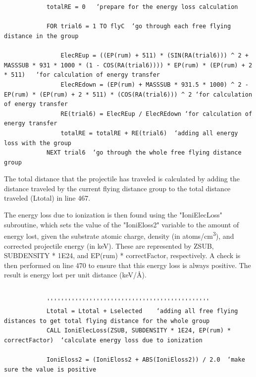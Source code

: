 \documentclass[10pt, reqno]{exam}
\begin{document}
\begin{verbatim}
    
    
            totalRE = 0   ‘prepare for the energy loss calculation 
    
            FOR trial6 = 1 TO flyC  ‘go through each free flying distance in the group
    
                ElecREup = ((EP(rum) + 511) * (SIN(RA(trial6))) ^ 2 + MASSSUB * 931 * 1000 * (1 - COS(RA(trial6)))) * EP(rum) * (EP(rum) + 2 * 511)   ‘for calculation of energy transfer 
                ElecREdown = (EP(rum) + MASSSUB * 931.5 * 1000) ^ 2 - EP(rum) * (EP(rum) + 2 * 511) * (COS(RA(trial6))) ^ 2 ‘for calculation of energy transfer
                RE(trial6) = ElecREup / ElecREdown ‘for calculation of energy transfer
                totalRE = totalRE + RE(trial6)  ‘adding all energy loss with the group
            NEXT trial6  ‘go through the whole free flying distance group 
\end{verbatim}

The total distance that the projectile has traveled is calculated by adding the distance traveled by the current flying distance group to the total distance traveled (Ltotal) in line 467. \par

The energy loss due to ionization is then found using the "IoniElecLoss" subroutine, which sets the value of the "IoniEloss2" variable to the amount of energy lost, given the substrate atomic charge, density (in \si{atoms/cm^3}), and corrected projectile energy (in keV). These are represented by ZSUB, SUBDENSITY * 1E24, and EP(rum) * correctFactor, respectively. A check is then performed on line 470 to ensure that this energy loss is always positive. The result is energy lost per unit distance (\si{keV/\angstrom}).\par

\begin{verbatim}
    
            ''''''''''''''''''''''''''''''''''''''''''''''
            Ltotal = Ltotal + Lselected    ‘adding all free flying distances to get total flying distance for the whole group 
            CALL IoniElecLoss(ZSUB, SUBDENSITY * 1E24, EP(rum) * correctFactor)  ‘calculate energy loss due to ionization 
    
            IoniEloss2 = (IoniEloss2 + ABS(IoniEloss2)) / 2.0  ‘make sure the value is positive 
\end{verbatim}
\end{document}
